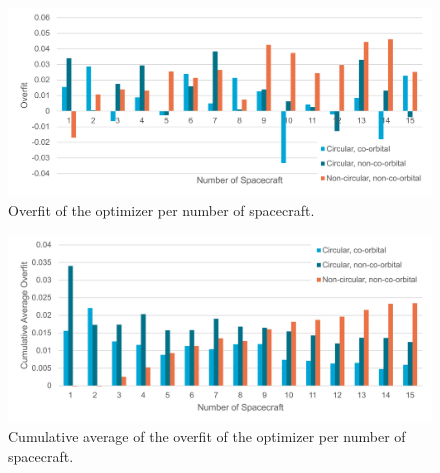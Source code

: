 \begin{figure}[htbp]
 \centering
 \includegraphics[width=1.0\textwidth]{img/overfit_free.pdf}
 \caption{Overfit of the optimizer per number of spacecraft.}
 \label{fig:overfit_free}
\end{figure}
\begin{figure}[htbp]
 \centering
 \includegraphics[width=1.0\textwidth]{img/overfit_free_cumulative_average.pdf}
 \caption{Cumulative average of the overfit of the optimizer per number of spacecraft.}
 \label{fig:overfit_free_cumulative_average}
\end{figure}

